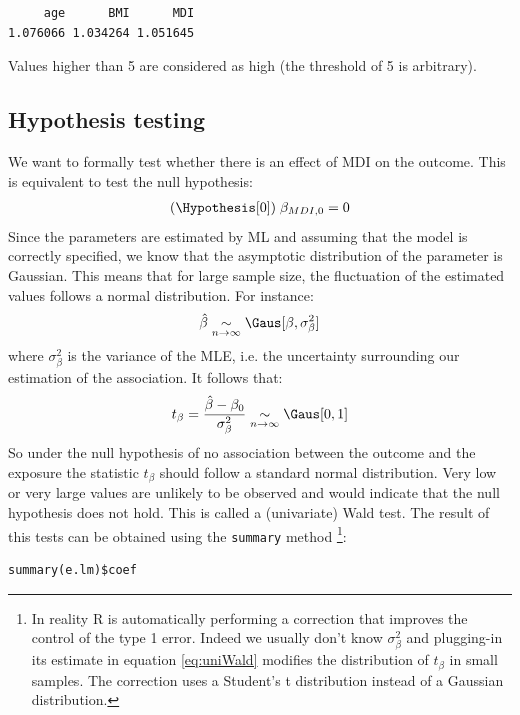 \documentclass{article}
\begin{document}
\begin{verbatim}
     age      BMI      MDI 
1.076066 1.034264 1.051645
\end{verbatim}
Values higher than 5 are considered as high (the threshold of 5 is
arbitrary).


\subsection{Hypothesis testing}
\label{sec:orgc9d99d6}

We want to formally test whether there is an effect of MDI on the
outcome. This is equivalent to test the null hypothesis:
\begin{align*}
(\Hypothesis[0]) \; \beta_{MDI,0} = 0
\end{align*}
 Since the parameters are estimated by ML and assuming that the model
is correctly specified, we know that the asymptotic distribution of
the parameter is Gaussian. This means that for large sample size, the
fluctuation of the estimated values follows a normal distribution. For
instance:
\begin{align*}
\hat{\beta} \underset{n \rightarrow \infty}{\sim} \Gaus[\beta,\sigma^2_\beta]
\end{align*}
where \(\sigma^2_\beta\) is the variance of the MLE, i.e. the
uncertainty surrounding our estimation of the association. It follows that:
\begin{align}
t_{\beta} = \frac{\hat{\beta}-\beta_0}{\sigma^2_\beta} \underset{n \rightarrow \infty}{\sim} \Gaus[0,1] \label{eq:uniWald}
\end{align}
So under the null hypothesis of no association between the outcome and
the exposure the statistic \(t_{\beta}\) should follow a standard
normal distribution. Very low or very large values are unlikely to be
observed and would indicate that the null hypothesis does not
hold. This is called a (univariate) Wald test. The result of this
tests can be obtained using the \texttt{summary} method \footnote{In reality R is automatically performing a correction that
improves the control of the type 1 error. Indeed we usually don't know
\(\sigma^2_\beta\) and plugging-in its estimate in equation
\eqref{eq:uniWald} modifies the distribution of \(t_{\beta}\) in small
samples. The correction uses a Student's t distribution instead of a
Gaussian distribution.}:
\lstset{language=r,label= ,caption= ,captionpos=b,numbers=none}
\begin{lstlisting}
summary(e.lm)$coef
\end{lstlisting}
\end{document}
